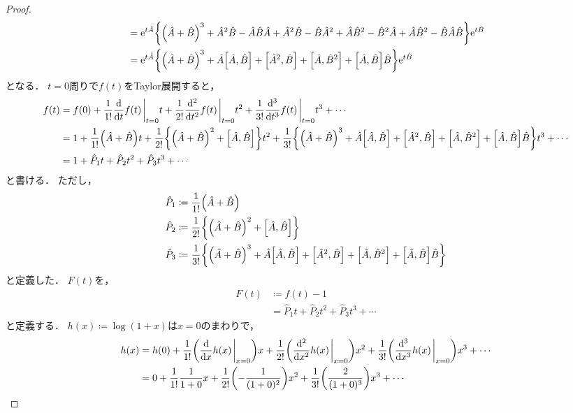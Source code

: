 \documentclass{report}
\begin{document}
\begin{proof}
\begin{align}
        &= \mathrm{e}^{t\hat{A}}\qty{\qty(\hat{A} + \hat{B})^3 + \hat{A}^2\hat{B} - \hat{A}\hat{B}\hat{A} + \hat{A}^2\hat{B} - \hat{B}\hat{A}^2 + \hat{A}\hat{B}^2 - \hat{B}^2\hat{A} + \hat{A}\hat{B}^2 - \hat{B}\hat{A}\hat{B}}\mathrm{e}^{t\hat{B}} \\ 
        &= \mathrm{e}^{t\hat{A}}\qty{\qty(\hat{A} + \hat{B})^3 + \hat{A}\qty[\hat{A}, \hat{B}] + \qty[\hat{A}^2, \hat{B}] + \qty[\hat{A}, \hat{B}^2] + \qty[\hat{A}, \hat{B}]\hat{B}}\mathrm{e}^{t\hat{B}} 
      \end{align}
      となる．
      $t = 0$周りで$f(t)$をTaylor展開すると，
      \begin{align}
        f(t) &= f(0) + \frac{1}{1!}\dv{t}f(t)\eval_{t = 0}t + \frac{1}{2!}\dv[2]{t}f(t)\eval_{t = 0}t^2 + \frac{1}{3!}\dv[3]{t}f(t)\eval_{t = 0}t^3 + \cdots \\ 
        &= 1 + \frac{1}{1!}\qty(\hat{A} + \hat{B})t + \frac{1}{2!}\qty{\qty(\hat{A} + \hat{B})^2 + \qty[\hat{A}, \hat{B}]}t^2 + \frac{1}{3!}\qty{\qty(\hat{A} + \hat{B})^3 + \hat{A}\qty[\hat{A}, \hat{B}] + \qty[\hat{A}^2, \hat{B}] + \qty[\hat{A}, \hat{B}^2] + \qty[\hat{A}, \hat{B}]\hat{B}}t^3 + \cdots \\ 
        &= 1 + \hat{P}_1t + \hat{P}_2t^2 + \hat{P}_3t^3 + \cdots \\ 
      \end{align}
      と書ける．
      ただし，
      \begin{align}
        \hat{P}_1 &\coloneqq \frac{1}{1!}\qty(\hat{A} + \hat{B}) \\ 
        \hat{P}_2 &\coloneqq \frac{1}{2!}\qty{\qty(\hat{A} + \hat{B})^2 + \qty[\hat{A}, \hat{B}]} \\ 
        \hat{P}_3 &\coloneqq \frac{1}{3!}\qty{\qty(\hat{A} + \hat{B})^3 + \hat{A}\qty[\hat{A}, \hat{B}] + \qty[\hat{A}^2, \hat{B}] + \qty[\hat{A}, \hat{B}^2] + \qty[\hat{A}, \hat{B}]\hat{B}}
      \end{align}
      と定義した．
      $F(t)$を，
      \begin{align}
        F(t) &\coloneqq f(t) - 1 \\ 
        &= \hat{P}_1t + \hat{P}_2t^2 + \hat{P}_3t^3 + \cdots
      \end{align}
      と定義する．
      $h(x) \coloneqq \log (1 + x)$は$x = 0$のまわりで，
      \begin{align}
        h(x) &= h(0) + \frac{1}{1!}\qty(\dv{x}h(x)\eval_{x = 0})x + \frac{1}{2!}\qty(\dv[2]{x}h(x)\eval_{x = 0})x^2 + \frac{1}{3!}\qty(\dv[3]{x}h(x)\eval_{x = 0})x^3 + \cdots \\ 
        &= 0 + \frac{1}{1!}\frac{1}{1 + 0}x + \frac{1}{2!}\qty(-\frac{1}{(1 + 0)^2})x^2 + \frac{1}{3!}\qty(\frac{2}{(1 + 0)^3})x^3 + \cdots

\end{align}
\end{proof}
\end{document}
